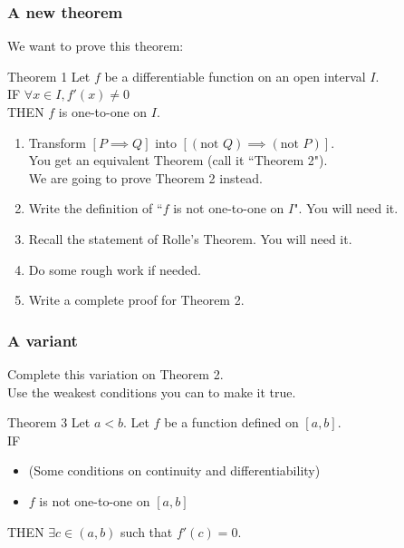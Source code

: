 \documentclass[14pt]{beamer}
\begin{document}
\begin{frame}[t]
	\fontsize{13}{13}\selectfont
	\frametitle{A new theorem}

	We want to prove this theorem:
	\begin{block}{\fontsize{13}{13}\selectfont Theorem 1}
		Let $f$ be a differentiable function on an open interval $I$. \\ IF
		$\displaystyle \forall x \in I, f'(x) \neq 0$ \\ THEN $f$ is one-to-one on
		$I$.
	\end{block}

	\vfill

	\begin{enumerate}
		\item Transform \quad $\displaystyle [P \implies Q]$ \quad into \quad $\displaystyle
			[(\text{not }Q) \implies (\text{not }P)]$. \\ You get an equivalent
			Theorem (call it ``Theorem 2"). \\ We are going to prove Theorem 2 instead.

		\item Write the definition of ``$f$ is not one-to-one on $I$". You will need
			it.

		\item Recall the statement of Rolle's Theorem. You will need it.

		\item Do some rough work if needed.

		\item Write a complete proof for Theorem 2.
	\end{enumerate}
\end{frame}

\begin{frame}[t]
	\frametitle{A variant}

	Complete this variation on Theorem 2. \\ Use the weakest conditions you can to
	make it true.

	\begin{block}{Theorem 3}
		Let $a<b$. Let $f$ be a function defined on $[a,b]$. \\ IF
		\begin{itemize}
			\item (Some conditions on continuity and differentiability)

			\item $f$ is not one-to-one on $[a,b]$
		\end{itemize}
		THEN $\displaystyle \exists c \in (a,b)$ such that $f'(c)=0$.
	\end{block}
\end{frame}
\end{document}

